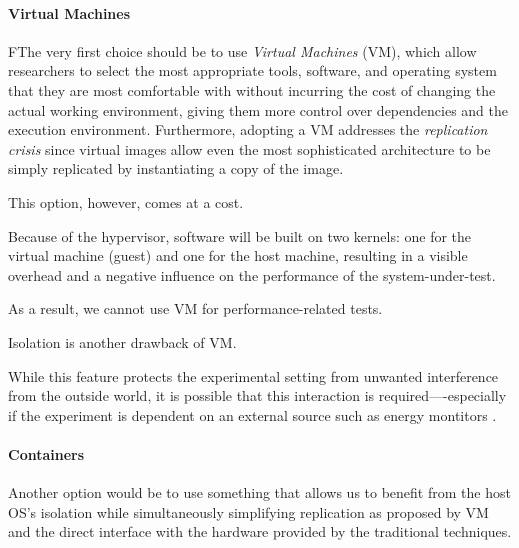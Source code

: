 \paragraph{Virtual Machines}
FThe very first choice should be to use \emph{Virtual Machines} (VM), which allow researchers to select the most appropriate tools, software, and operating system that they are most comfortable with without incurring the cost of changing the actual working environment, giving them more control over dependencies and the execution environment.
Furthermore, adopting a VM addresses the \emph{replication crisis} since virtual images allow even the most sophisticated architecture to be simply replicated by instantiating a copy of the image.

This option, however, comes at a cost.

Because of the hypervisor, software will be built on two kernels: one for the virtual machine (guest) and one for the host machine, resulting in a visible overhead and a negative influence on the performance of the system-under-test.

As a result, we cannot use VM for performance-related tests.

Isolation is another drawback of VM.

While this feature protects the experimental setting from unwanted interference from the outside world, it is possible that this interaction is required—-especially if the experiment is dependent on an external source such as energy montitors .

\paragraph{Containers}
Another option would be to use something that allows us to benefit from the host OS's isolation while simultaneously simplifying replication as proposed by VM and the direct interface with the hardware provided by the traditional techniques.

